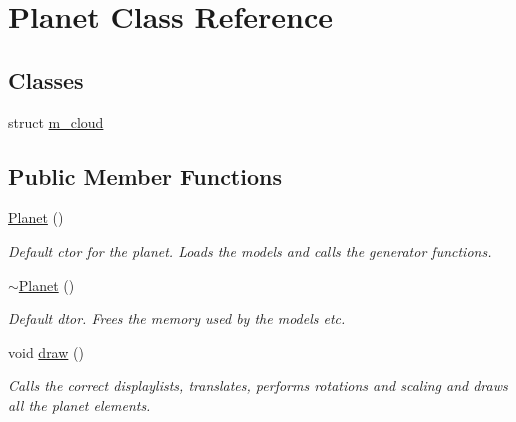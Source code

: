 \hypertarget{classPlanet}{
\section{Planet Class Reference}
\label{classPlanet}
}
\subsection*{Classes}
\begin{DoxyCompactItemize}
\item 
struct \hyperlink{structPlanet_1_1m__cloud}{m\_\-cloud}
\end{DoxyCompactItemize}
\subsection*{Public Member Functions}
\begin{DoxyCompactItemize}
\item 
\hypertarget{classPlanet_ac88200b337a62e1377858e3116f9412b}{
\hyperlink{classPlanet_ac88200b337a62e1377858e3116f9412b}{Planet} ()}
\label{classPlanet_ac88200b337a62e1377858e3116f9412b}

\begin{DoxyCompactList}\small\item\em Default ctor for the planet. Loads the models and calls the generator functions. \item\end{DoxyCompactList}\item 
\hypertarget{classPlanet_aaa1aaed9d4ef90b4836531edb7b18e0a}{
\hyperlink{classPlanet_aaa1aaed9d4ef90b4836531edb7b18e0a}{$\sim$Planet} ()}
\label{classPlanet_aaa1aaed9d4ef90b4836531edb7b18e0a}

\begin{DoxyCompactList}\small\item\em Default dtor. Frees the memory used by the models etc. \item\end{DoxyCompactList}\item 
\hypertarget{classPlanet_afe1d5a814cade5105996bb94018842bb}{
void \hyperlink{classPlanet_afe1d5a814cade5105996bb94018842bb}{draw} ()}
\label{classPlanet_afe1d5a814cade5105996bb94018842bb}

\begin{DoxyCompactList}\small\item\em Calls the correct displaylists, translates, performs rotations and scaling and draws all the planet elements. \item\end{DoxyCompactList}\end{DoxyCompactItemize}
